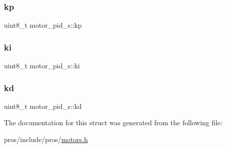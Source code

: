 \mbox{\label{structmotor__pid__s_a31c38ff6a4245e81c4db42579b90be31}} 
\subsubsection{\texorpdfstring{kp}{kp}}
{\footnotesize\ttfamily uint8\+\_\+t motor\+\_\+pid\+\_\+s\+::kp}

\mbox{\label{structmotor__pid__s_ac894dd6c3683c2daa403b81e259a1cae}} 
\subsubsection{\texorpdfstring{ki}{ki}}
{\footnotesize\ttfamily uint8\+\_\+t motor\+\_\+pid\+\_\+s\+::ki}

\mbox{\label{structmotor__pid__s_a5241cf4e6e0b3aed6cf9fc52d83769ab}} 
\subsubsection{\texorpdfstring{kd}{kd}}
{\footnotesize\ttfamily uint8\+\_\+t motor\+\_\+pid\+\_\+s\+::kd}



The documentation for this struct was generated from the following file\+:\begin{DoxyCompactItemize}
\item 
pros/include/pros/\hyperlink{motors_8h}{motors.\+h}\end{DoxyCompactItemize}
